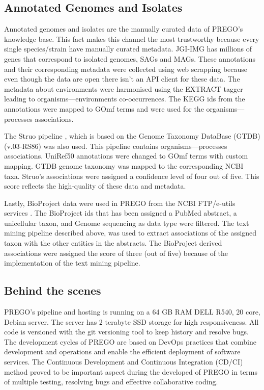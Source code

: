    \subsection{Annotated Genomes and Isolates}
   \label{subsec:prego-isolates}

Annotated genomes and isolates are the manually curated data of PREGO's knowledge base.
This fact makes this channel the most trustworthy because every single species/strain have manually curated metadata. 
JGI-IMG \parencite{chen2021img, mukherjee2021genomes} has millions of genes that 
correspond to isolated genomes, SAGs and MAGs. These annotations and their corresponding metadata
were collected using web scrapping because even though the data are open there isn't an API client for these data.
The metadata about environments were harmonised using the EXTRACT tagger leading to organisms—environments co-occurrences.
The KEGG ids from the annotations were mapped to GOmf terms and were used for the organisms—processes associations.
   
The Struo pipeline \parencite{de2020struo}, which is based on the Genome Taxonomy DataBase (GTDB) (v.03-RS86) \parencite{parks2020complete} was also used.
This pipeline contains organisms—processes associations. 
UniRef50 annotations were changed to GOmf terms with custom mapping. 
GTDB genome taxonomy was mapped to the corresponding NCBI taxa. 
Struo's associations were assigned a confidence level of four out of five. 
This score reflects the high-quality of these data and metadata.
   
Lastly, BioProject data were used in PREGO from the NCBI FTP/e-utils services \parencite{sayers2021database}. 
The BioProject ids that has been assigned a PubMed abstract, a unicellular taxon, and Genome sequencing as data type were filtered.
The text mining pipeline described above, was used to extract associations of the
assigned taxon with the other entities in the abstracts. 
The BioProject derived associations were assigned the score of three (out of five)
because of the implementation of the text mining pipeline.

\subsection{Behind the scenes}
\label{deamons}

PREGO's pipeline and hosting is running on a 64 GB RAM DELL R540, 20 core, Debian server.
The server has 2 terabyte SSD storage for high responsiveness. 
All code is versioned with the git versioning tool to keep history and 
resolve bugs. The development cycles of PREGO are based on DevOps practices that
combine development and operations and enable the efficient deployment of software services.
The Continuous Development and Continuous Integration (CD/CI) method proved to be
important aspect during the developed of PREGO in terms of multiple testing,
resolving bugs and effective collaborative coding. 

